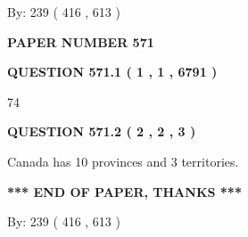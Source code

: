\documentclass[12pt]{article}
\begin{document}
   
\hspace{1.0in} By: 
 239 ( 416 ,  613 )
   
   
   
   
\newpage 
\setcounter{page}{ 
   571001 } 
   
   
   
   
 {\textbf{ \Large{ PAPER NUMBER  571  }}}
   
   
\vspace{0.2in}
   
   
   
   
   
   
 \vspace{0.2in}
 
 
 
 
   
   
  
\vspace{0.2in}
  
{\textbf{\Large{QUESTION
571.1 
 ( 1 , 1 , 6791 )
}}}
  
  
 
 
\noindent{}

74
 
 
  
\vspace{0.2in}
  
{\textbf{\Large{QUESTION
571.2 
 ( 2 , 2 , 3 )
}}}
  
  
 
 
\noindent{}
 
 
Canada has 10  provinces and 3 territories.
 
 
 
 
   
   
 \vspace{0.2in}
 
   
   
   
   
\vspace{1.0in} 
{\textbf{\large{ *** END OF PAPER, THANKS *** }}} 
   
   
\hspace{1.0in} By: 
 239 ( 416 ,  613 )
   
   
   
   
\newpage 
\setcounter{page}{ 
   572001 } 
   
\end{document}
